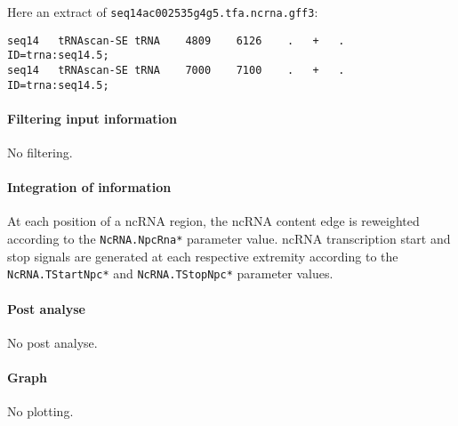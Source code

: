 Here an extract of \texttt{seq14ac002535g4g5.tfa.ncrna.gff3}:
\begin{Verbatim}[fontsize=\tiny]
seq14	tRNAscan-SE	tRNA	4809	6126	.	+	.	ID=trna:seq14.5;
seq14	tRNAscan-SE	tRNA	7000	7100	.	+	.	ID=trna:seq14.5;
\end{Verbatim}

\paragraph{Filtering input information}

No filtering.

\paragraph{Integration of information}

At each position of a ncRNA region, the ncRNA content edge is reweighted according to the 
\texttt{NcRNA.NpcRna*} parameter value. ncRNA transcription start and stop signals 
are generated at each respective extremity according to the \texttt{NcRNA.TStartNpc*} and \texttt{NcRNA.TStopNpc*} parameter values.


\paragraph{Post analyse}

No post analyse.

\paragraph{Graph}

No plotting.










